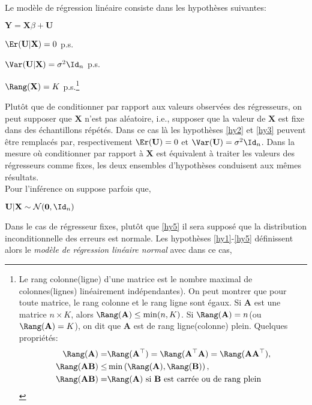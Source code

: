Le modèle de régression linéaire consiste dans les hypothèses suivantes:
\begin{hypothese}
$\mathbf{Y} = \mathbf{X}\beta +\mathbf{U}$
\label{hy1}
\end{hypothese}
\begin{hypothese}
$\Er(\mathbf{U} | \mathbf{X}) = 0$ p.s.
\label{hy2}
\end{hypothese}
\begin{hypothese}
$\Var(\mathbf{U}|\mathbf{X}) = \sigma^2\Id_n$ p.s.
\label{hy3}
\end{hypothese}
\begin{hypothese}
$\Rang(\mathbf{X}) = K$ p.s.\footnote{Le rang colonne(ligne) d'une matrice est le nombre maximal de colonnes(lignes) linéairement indépendantes). On peut montrer que pour toute matrice, le rang colonne et le rang ligne sont égaux. Si $\mathbf{A}$ est une matrice $n\times K$, alors $\Rang(\mathbf{A}) \leq \min (n, K)$. Si  $\Rang(\mathbf{A}) = n$(ou $\Rang(\mathbf{A}) = K$), on dit que $\mathbf{A}$ est de rang ligne(colonne) plein. Quelques propriétés:
\begin{align*}
\Rang(\mathbf{A}) =& \Rang(\mathbf{A}^\top) =  \Rang(\mathbf{A}^\top \mathbf{A})  =   \Rang(\mathbf{A}\mathbf{A}^\top ),\\
\Rang(\mathbf{A}\mathbf{B}) \leq& \min \left(\Rang(\mathbf{A}), \Rang(\mathbf{B})\right),\\
\Rang(\mathbf{A}\mathbf{B})=&\Rang(\mathbf{A}) \ \textrm{si $\mathbf{B}$ est carrée ou de rang plein}
\end{align*}
  }
\label{hy4}
\end{hypothese}
Plutôt que de conditionner par rapport  aux valeurs observées des régresseurs, on peut supposer que $\mathbf{X}$ n'est pas aléatoire, i.e., supposer que la valeur de $\mathbf{X}$ est fixe dans des échantillons répétés. Dans ce cas là les hypothèses \ref{hy2} et \ref{hy3} peuvent être remplacés par, respectivement $\Er(\mathbf{U}) = 0$ et $\Var(\mathbf{U}) = \sigma^2\Id_n$. Dans la mesure où conditionner par rapport à $\mathbf{X}$ est équivalent à traiter les valeurs des régresseurs comme fixes, les deux ensembles d'hypothèses conduisent aux mêmes résultats.\\
Pour l'inférence on suppose parfois que,
\begin{hypothese}
$\mathbf{U} | \mathbf{X} \sim \mathcal{N}(\mathbf{0}, \Id_n)$
\label{hy5}
\end{hypothese}
Dans le cas de régresseur fixes, plutôt que \ref{hy5} il sera supposé que la distribution inconditionnelle des erreurs est normale. Les hypothèses \ref{hy1}-\ref{hy5} définissent alors le \emph{modèle de régression linéaire normal} avec dans ce cas,
